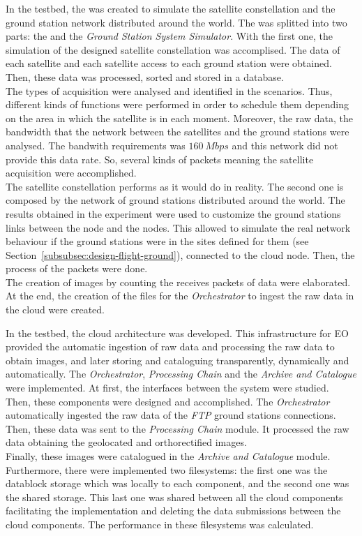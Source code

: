 In the \vw testbed, the \sss was created to simulate the satellite
constellation and the ground station network distributed around the world.
The \sss was splitted into two parts: the \satss and the \emph{Ground Station
  System Simulator}. With the first one, the simulation of
the designed satellite constellation was accomplised. The data of each satellite and each
satellite access to each ground station were obtained. Then, these data was
processed, sorted and stored in a database. \\
The types of acquisition were
analysed and identified in the scenarios. Thus, different kinds of functions
were performed in order to schedule them depending on the area in which the
satellite is in each moment. Moreover, the raw data, the bandwidth that the
network between the satellites and the ground stations were analysed. The
bandwith requirements was $160~Mbps$ and this network did not provide this data
rate. So, several kinds of packets meaning the satellite acquisition were
accomplished. \\
The satellite constellation performs as it would do in reality.
The second one is composed by the network of ground stations distributed around
the world. The results obtained in the \pl experiment were used to customize the
ground stations links
between the node and the \bonfire nodes. This allowed to simulate the real
network behaviour if the ground stations were in the sites defined for them (see Section~\ref{subsubsec:design-flight-ground}), connected to the \bonfire cloud
node. Then, the process of the packets were done. \\
The creation of images by
counting the receives packets of data were elaborated. At the end, the creation
of the files for the \emph{Orchestrator} to ingest the raw data in the cloud were
created.


In the \bonfire testbed, the cloud architecture was developed. This
infrastructure for \ac{EO} provided the automatic ingestion of raw data and processing the raw data to
obtain images, and later storing and cataloguing transparently, dynamically and automatically. The \emph{Orchestrator}, \emph{Processing Chain} and the \emph{Archive and
  Catalogue} were implemented. At first, the interfaces between the system were
studied. Then, these components were designed and accomplished. The
\emph{Orchestrator} automatically ingested the raw data of the \emph{FTP} ground
stations connections. Then, these data was sent to the \emph{Processing Chain}
module. It processed the raw data obtaining the geolocated and orthorectified
images.  \\
Finally, these images were catalogued in the \emph{Archive and
  Catalogue} module. Furthermore, there were implemented two filesystems: the
first one was the datablock storage which was locally to each component, and the
second one was the shared storage. This last one was shared between all the cloud
components facilitating the implementation and deleting the data submissions
between the cloud components. The performance in these filesystems was
calculated. 


